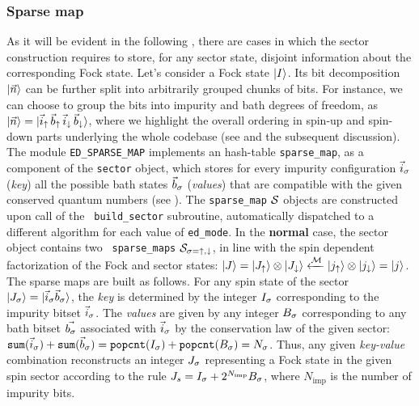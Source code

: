 \documentclass[edipack2.tex]{subfiles}
\begin{document}
\subsubsection{Sparse map}\label{CodeSparseMap}
As it will be evident in the following , there are cases in
which the sector construction requires to store, for any sector state,
disjoint information about the corresponding Fock state.
Let's consider a Fock state $|I\rangle$. Its bit decomposition
$|\vec{n}\rangle$ can be further split into arbitrarily grouped chunks of bits.
For instance, we can choose to group the bits into impurity and bath degrees of freedom,
as $|\vec{n}\rangle=|\vec{i}_\uparrow\,\vec{b}_\uparrow\,\vec{i}_\downarrow\,\vec{b}_\downarrow\rangle$, where we 
highlight the overall ordering in spin-up and spin-down parts underlying the whole
codebase (see  and the subsequent discussion).  
The module {\tt ED\_SPARSE\_MAP} implements an hash-table {\tt sparse\_map}, 
as a component of the {\tt sector} object, which stores for every impurity 
configuration $\vec{i}_\sigma$ (\emph{key}) all the possible bath states $\vec{b}_\sigma$ (\emph{values})
that are compatible with the given conserved quantum numbers (see ).
The {\tt sparse\_map} ${\cal S}$ objects are constructed upon call of the {\tt
  build\_sector} subroutine, automatically dispatched to a different algorithm 
for each value of {\tt ed\_mode}.
In the {\bf normal} case, the sector object contains two {\tt
  sparse\_maps} ${\cal S}_{\sigma=\uparrow,\downarrow}$, in line with the
spin dependent factorization of the Fock and sector states: 
$|J\rangle=|J_\uparrow\rangle\otimes|J_\downarrow\rangle \xleftarrow{{\cal M}}
|j_\uparrow\rangle\otimes|j_\downarrow\rangle=|j\rangle$.
The sparse maps are built as follows. 
For any spin state of the sector $|J_\sigma\rangle=|{\vec{i}_{\sigma}\vec{b}_{\sigma}}\rangle$,
the \emph{key} is determined by the integer $I_\sigma$ corresponding to the
impurity bitset $\vec{i}_\sigma$. The \emph{values} are given by any
integer $B_\sigma$ corresponding to any bath bitset
$\vec{b_\sigma}$ associated with $\vec{i}_\sigma$ by the conservation law of the 
given sector: $\mathtt{sum}(\vec{i}_\sigma) + \mathtt{sum}(\vec{b}_\sigma) = \mathtt{popcnt}(I_\sigma) + \mathtt{popcnt}(B_\sigma)= N_\sigma$.
Thus, any given \emph{key-value} combination 
reconstructs an integer $J_\sigma$ representing a Fock state in the
given spin sector according to the rule $J_s = I_\sigma +
2^{N_\mathrm{imp}}B_\sigma$, where $N_\mathrm{imp}$ is the number of impurity bits. 
\end{document}
